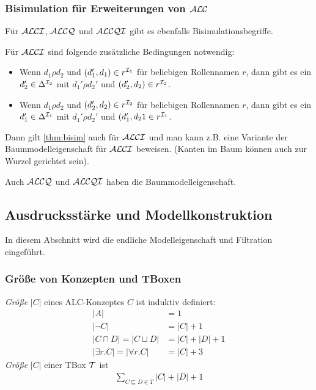 \subsubsection{Bisimulation für Erweiterungen von \texorpdfstring{$\mathcal{A}\mathcal{L}\mathcal{C}$}{ALC}}\label{bisimulation-in-alc}

Für $\mathcal{A}\mathcal{L}\mathcal{C}\mathcal{I}$, $\mathcal{A}\mathcal{L}\mathcal{C}\mathcal{Q}$ und $\mathcal{A}\mathcal{L}\mathcal{C}\mathcal{Q}\mathcal{I}$ gibt es ebenfalls Bisimulationsbegriffe.

Für $\mathcal{A}\mathcal{L}\mathcal{C}\mathcal{I}$ sind folgende zusätzliche Bedingungen notwendig:
\begin{itemize}
    \item Wenn $d_1 \rho d_2$ und $(d_1', d_1) \in r^{\mathcal{I}_1}$ für beliebigen Rollennamen $r$, dann gibt es ein $d_2' \in \Delta^{\mathcal{I}_2}$ mit $d_1' \rho d_2'$ und $(d_2', d_2) \in r^{\mathcal{I}_2}$.
    \item Wenn $d_1 \rho d_2$ und $(d_2', d_2) \in r^{\mathcal{I}_2}$ für beliebigen Rollennamen $r$, dann gibt es ein $d_1' \in \Delta^{\mathcal{I}_1}$ mit $d_1' \rho d_2'$ und $(d_1', d_21 \in r^{\mathcal{I}_1}$.
\end{itemize}
Dann gilt \autoref{thm:bisim} auch für $\mathcal{A}\mathcal{L}\mathcal{C}\mathcal{I}$ und man kann z.B. eine Variante der Baummodelleigenschaft für $\mathcal{A}\mathcal{L}\mathcal{C}\mathcal{I}$ beweisen. (Kanten im Baum können auch zur Wurzel gerichtet sein).

Auch $\mathcal{A}\mathcal{L}\mathcal{C}\mathcal{Q}$ und $\mathcal{A}\mathcal{L}\mathcal{C}\mathcal{Q}\mathcal{I}$ haben die Baummodelleigenschaft.

\subsection{Ausdrucksstärke und
Modellkonstruktion}\label{ausdrucksstuxe4rke-und-modellkonstruktion}

In diesem Abschnitt  wird die endliche Modelleigenschaft und Filtration eingeführt.

\subsubsection{Größe von Konzepten und
TBoxen}\label{gruxf6uxdfe-von-konzepten-und-tboxen}

\begin{definition}[Größe]
\emph{Größe} $\left| C \right|$ eines ALC-Konzeptes $C$ ist induktiv
definiert:
\begin{align*}
    \left| A \right| &= 1\\
    \left| \neg C \right| &= \left| C \right| + 1\\
    \left| C \sqcap D \right| = \left| C \sqcup D \right| &= \left| C \right| + \left| D \right| + 1\\
    \left| \exists r.C \right| = \left| \forall r.C \right| &= \left| C \right| + 3
\end{align*}
\emph{Größe} $\left| C \right|$ einer TBox $\mathcal{T}$ ist
\begin{align*}
  \sum_{C \sqsubseteq D \in T} \left| C \right| + \left| D \right| + 1
\end{align*}
\end{definition}

